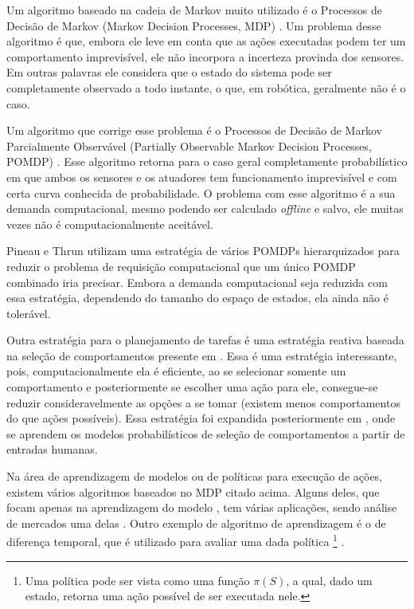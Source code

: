 Um algoritmo baseado na cadeia de Markov muito utilizado é o Processos de Decisão de Markov (Markov Decision Processes, MDP) \cite{Thrun:2005:PR:1121596}. Um problema desse algoritmo é que, embora ele leve em conta que as ações executadas podem ter um comportamento imprevisível, ele não incorpora a incerteza provinda dos sensores. Em outras palavras ele considera que o estado do sistema pode ser completamente observado a todo instante, o que, em robótica, geralmente não é o caso.

Um algoritmo que corrige esse problema é o Processos de Decisão de Markov Parcialmente Observável (Partially Observable Markov Decision Processes, POMDP) \cite{Thrun:2005:PR:1121596}. Esse algoritmo retorna para o caso geral completamente probabilístico em que ambos os sensores e os atuadores tem funcionamento imprevisível e com certa curva conhecida de probabilidade. O problema com esse algoritmo é a sua demanda computacional, mesmo podendo ser calculado \textit{offline} e salvo, ele muitas vezes não é computacionalmente aceitável.

Pineau e Thrun \cite{Pineau01hierarchicalpomdp} utilizam uma estratégia de vários POMDPs hierarquizados para reduzir o problema de requisição computacional que um único POMDP combinado iria precisar. Embora a demanda computacional seja reduzida com essa estratégia, dependendo do tamanho do espaço de estados, ela ainda não é tolerável.

Outra estratégia para o planejamento de tarefas é uma estratégia reativa baseada na seleção de comportamentos presente em \cite{Koike:2005,lidoris2008}. Essa é uma estratégia interessante, pois, computacionalmente ela é eficiente, ao se selecionar somente um comportamento e posteriormente se escolher uma ação para ele, consegue-se reduzir consideravelmente as opções a se tomar (existem menos comportamentos do que ações possíveis). Essa estratégia foi expandida posteriormente em \cite{lidoris2011state}, onde se aprendem os modelos probabilísticos de seleção de comportamentos a partir de entradas humanas.

Na área de aprendizagem de modelos ou de políticas para execução de ações, existem vários algoritmos baseados no MDP citado acima. Alguns deles, que focam apenas na aprendizagem do modelo \cite{calvet:hal-00674226,Gutmann_noise-contrastiveestimation}, tem várias aplicações, sendo análise de mercados uma delas \cite{calvet:hal-00674226}. Outro exemplo de algoritmo de aprendizagem é o de diferença temporal, que é utilizado para avaliar uma dada política%
\footnote{Uma política pode ser vista como uma função $ \pi \left( S \right) $, a qual, dado um estado, retorna uma ação possível de ser executada nele.%
}
\cite{Sutton:1988:LPM,Andreas:2007,sutton1998reinforcement}.

